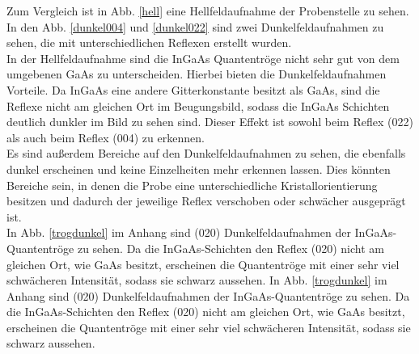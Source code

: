 \documentclass[a4paper,11pt,DIV=11]{scrartcl}
\begin{document}
Zum Vergleich ist in Abb. \ref{hell} eine Hellfeldaufnahme der Probenstelle zu sehen. In den Abb. \ref{dunkel004} und \ref{dunkel022} sind zwei Dunkelfeldaufnahmen zu sehen, die mit unterschiedlichen Reflexen erstellt wurden. \\
In der Hellfeldaufnahme sind die InGaAs Quantentröge nicht sehr gut von dem umgebenen GaAs zu unterscheiden. Hierbei bieten die Dunkelfeldaufnahmen Vorteile. Da InGaAs eine andere Gitterkonstante besitzt als GaAs, sind die Reflexe nicht am gleichen Ort im Beugungsbild, sodass die InGaAs Schichten deutlich dunkler im Bild zu sehen sind. Dieser Effekt ist sowohl beim Reflex (022) als auch beim Reflex (004) zu erkennen. \\
Es sind außerdem Bereiche auf den Dunkelfeldaufnahmen zu sehen, die ebenfalls dunkel erscheinen und keine Einzelheiten mehr erkennen lassen. Dies könnten Bereiche sein, in denen die Probe eine unterschiedliche Kristallorientierung besitzen und dadurch der jeweilige Reflex verschoben oder schwächer ausgeprägt ist. \\
In Abb. \ref{trogdunkel} im Anhang sind (020) Dunkelfeldaufnahmen der InGaAs-Quantentröge zu sehen. Da die InGaAs-Schichten den Reflex (020) nicht am gleichen Ort, wie GaAs besitzt, erscheinen die Quantentröge mit einer sehr viel schwächeren Intensität, sodass sie schwarz aussehen.
In Abb. \ref{trogdunkel} im Anhang sind (020) Dunkelfeldaufnahmen der InGaAs-Quantentröge zu sehen. Da die InGaAs-Schichten den Reflex (020) nicht am gleichen Ort, wie GaAs besitzt, erscheinen die Quantentröge mit einer sehr viel schwächeren Intensität, sodass sie schwarz aussehen.
\end{document}
